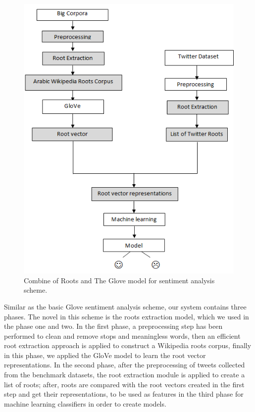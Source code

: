 \documentclass[conference]{IEEEtran}
\begin{document}
\begin{figure}[htbp]
		\centerline{\includegraphics[scale=0.70]{RootGloveSA.png}}
	\caption{Combine of Roots and The Glove model for sentiment analysis scheme.}
	\label{fig}
  
\end{figure}
Similar as the basic Glove sentiment analysis scheme, our system contains three phases. The novel in this scheme is the roots extraction model, which we used in the phase one and two. In the first phase, a preprocessing step has been performed to clean and remove stops and meaningless words, then an efficient root extraction approach is applied to construct a Wikipedia roots corpus, finally in this phase, we applied the GloVe model to learn the root vector representations. In the second phase, after the preprocessing of tweets collected from the benchmark datasets, the root extraction module is applied to create a list of roots; after, roots are compared with the root vectors created in the first step and get their representations, to be used as features in the third phase for machine learning classifiers in order to create models.
\end{document}
